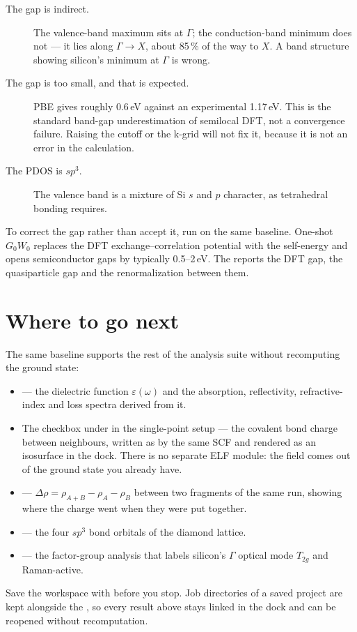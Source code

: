 \begin{description}
  \item[The gap is indirect.] The valence-band maximum sits at $\Gamma$; the
    conduction-band minimum does not --- it lies along $\Gamma \to X$, about
    85\,\% of the way to $X$. A band structure showing silicon's minimum at
    $\Gamma$ is wrong.
  \item[The gap is too small, and that is expected.] PBE gives roughly
    0.6\,eV against an experimental 1.17\,eV. This is the standard
    band-gap underestimation of semilocal DFT, not a convergence failure.
    Raising the cutoff or the k-grid will not fix it, because it is not an
    error in the calculation.
  \item[The PDOS is $sp^3$.] The valence band is a mixture of Si $s$ and $p$
    character, as tetrahedral bonding requires.
\end{description}

\begin{caltip}
To correct the gap rather than accept it, run
\menusep{} on the same baseline.
One-shot $G_0W_0$ replaces the DFT exchange--correlation potential with the
self-energy and opens semiconductor gaps by typically 0.5--2\,eV. The
 reports the DFT gap, the quasiparticle gap and the
renormalization between them.
\end{caltip}

\section{Where to go next}

The same baseline supports the rest of the analysis suite without recomputing
the ground state:

\begin{itemize}
  \item {}\menusep{} --- the dielectric function
    $\varepsilon(\omega)$ and the absorption, reflectivity, refractive-index
    and loss spectra derived from it.
  \item The  checkbox under  in the single-point
    setup --- the covalent bond charge between neighbours, written as
     by the same SCF and rendered as an isosurface in the
     dock. There is no separate ELF module: the field
    comes out of the ground state you already have.
  \item {}\menusep{} ---
    $\Delta\rho = \rho_{A+B} - \rho_A - \rho_B$ between two fragments of the
    same run, showing where the charge went when they were put together.
  \item {}\menusep{} --- the four
    $sp^3$ bond orbitals of the diamond lattice.
  \item {}\menusep{} --- the factor-group
    analysis that labels silicon's $\Gamma$ optical mode $T_{2g}$ and
    Raman-active.
\end{itemize}

Save the workspace with \menusep{} before you stop. Job
directories of a saved project are kept alongside the , so
every result above stays linked in the  dock and can be reopened
without recomputation.
